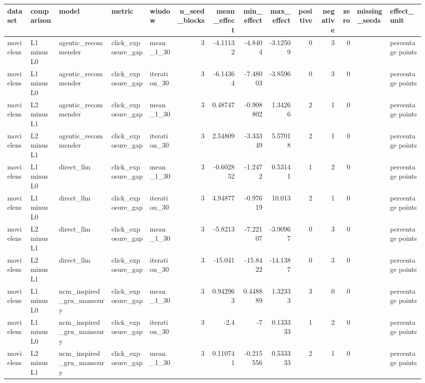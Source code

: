 \begin{table}[htbp!]
\centering
\small
\setlength{\tabcolsep}{3pt}
\renewcommand{\arraystretch}{1.1}
\begin{tabular}{lllllrrrrrrrll}
\hline
dataset & comparison & model & metric & window & n\_seed\_blocks & mean\_effect & min\_effect & max\_effect & positive & negative & zero & missing\_seeds & effect\_unit \\
\hline
movielens & L1 minus L0 & agentic\_recommender & click\_exposure\_gap & mean\_1\_30 & 3 & -4.11132 & -4.8404 & -3.12509 & 0 & 3 & 0 &  & percentage points \\
movielens & L1 minus L0 & agentic\_recommender & click\_exposure\_gap & iteration\_30 & 3 & -6.14364 & -7.48003 & -3.8596 & 0 & 3 & 0 &  & percentage points \\
movielens & L2 minus L1 & agentic\_recommender & click\_exposure\_gap & mean\_1\_30 & 3 & 0.48747 & -0.908802 & 1.34266 & 2 & 1 & 0 &  & percentage points \\
movielens & L2 minus L1 & agentic\_recommender & click\_exposure\_gap & iteration\_30 & 3 & 2.54809 & -3.33349 & 5.57018 & 2 & 1 & 0 &  & percentage points \\
movielens & L1 minus L0 & direct\_llm & click\_exposure\_gap & mean\_1\_30 & 3 & -0.602852 & -1.2472 & 0.53141 & 1 & 2 & 0 &  & percentage points \\
movielens & L1 minus L0 & direct\_llm & click\_exposure\_gap & iteration\_30 & 3 & 4.94877 & -0.97619 & 10.013 & 2 & 1 & 0 &  & percentage points \\
movielens & L2 minus L1 & direct\_llm & click\_exposure\_gap & mean\_1\_30 & 3 & -5.8213 & -7.22107 & -3.90967 & 0 & 3 & 0 &  & percentage points \\
movielens & L2 minus L1 & direct\_llm & click\_exposure\_gap & iteration\_30 & 3 & -15.041 & -15.8422 & -14.1387 & 0 & 3 & 0 &  & percentage points \\
movielens & L1 minus L0 & ncm\_inspired\_gru\_mansoury & click\_exposure\_gap & mean\_1\_30 & 3 & 0.942963 & 0.448889 & 1.32333 & 3 & 0 & 0 &  & percentage points \\
movielens & L1 minus L0 & ncm\_inspired\_gru\_mansoury & click\_exposure\_gap & iteration\_30 & 3 & -2.4 & -7 & 0.133333 & 1 & 2 & 0 &  & percentage points \\
movielens & L2 minus L1 & ncm\_inspired\_gru\_mansoury & click\_exposure\_gap & mean\_1\_30 & 3 & 0.110741 & -0.215556 & 0.533333 & 2 & 1 & 0 &  & percentage points \\

\end{tabular}
\end{table}
